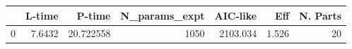 \begin{tabular}{lrrrrrr}
\toprule
{} &  L-time &     P-time &  N\_params\_expt &  AIC-like &    Eff &  N. Parts \\
\midrule
0 &  7.6432 &  20.722558 &           1050 &  2103.034 &  1.526 &        20 \\
\bottomrule
\end{tabular}
